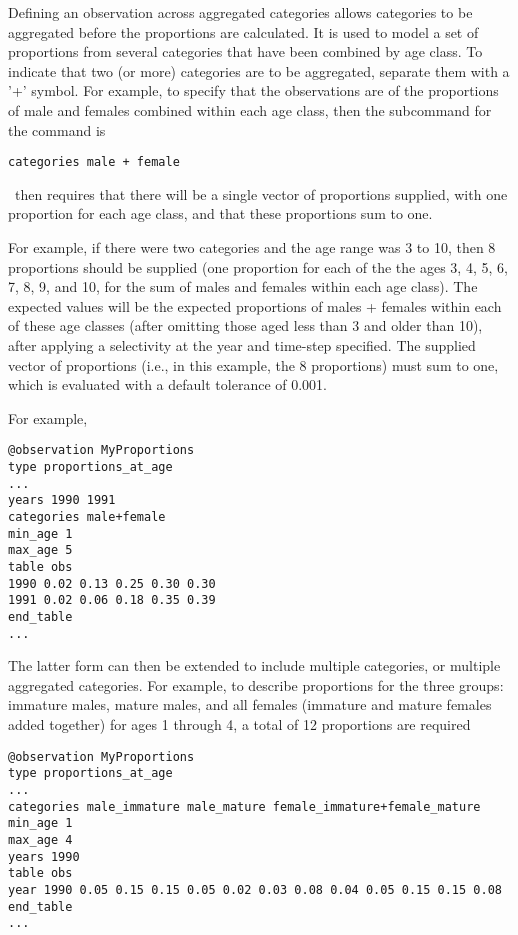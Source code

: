 Defining an observation across aggregated categories allows categories to be aggregated before the proportions are calculated. It is used to model a set of proportions from several categories that have been combined by age class. To indicate that two (or more) categories are to be aggregated, separate them with a '+' symbol. For example, to specify that the observations are of the proportions of male and females combined within each age class, then the subcommand  for the  command is

{\small{\begin{verbatim}
categories male + female
\end{verbatim}}}

\CNAME\ then requires that there will be a single vector of proportions supplied, with one proportion for each age class, and that these proportions sum to one.

For example, if there were two categories and the age range was 3 to 10, then 8 proportions should be supplied (one proportion for each of the the ages 3, 4, 5, 6, 7, 8, 9, and 10, for the sum of males and females within each age class). The expected values will be the expected proportions of males + females within each of these age classes (after omitting those aged less than 3 and older than 10), after applying a selectivity at the year and time-step specified. The supplied vector of proportions (i.e., in this example, the 8 proportions) must sum to one, which is evaluated with a default tolerance of 0.001.

For example,

{\small{\begin{verbatim}
@observation MyProportions
type proportions_at_age
...
years 1990 1991
categories male+female
min_age 1
max_age 5
table obs
1990 0.02 0.13 0.25 0.30 0.30
1991 0.02 0.06 0.18 0.35 0.39
end_table
...
\end{verbatim}}}

The latter form can then be extended to include multiple categories, or multiple aggregated categories. For example, to describe proportions for the three groups: immature males, mature males, and all females (immature and mature females added together) for ages 1 through 4, a total of 12 proportions are required

{\small{\begin{verbatim}
@observation MyProportions
type proportions_at_age
...
categories male_immature male_mature female_immature+female_mature
min_age 1
max_age 4
years 1990
table obs
year 1990 0.05 0.15 0.15 0.05 0.02 0.03 0.08 0.04 0.05 0.15 0.15 0.08
end_table
...
\end{verbatim}}}

